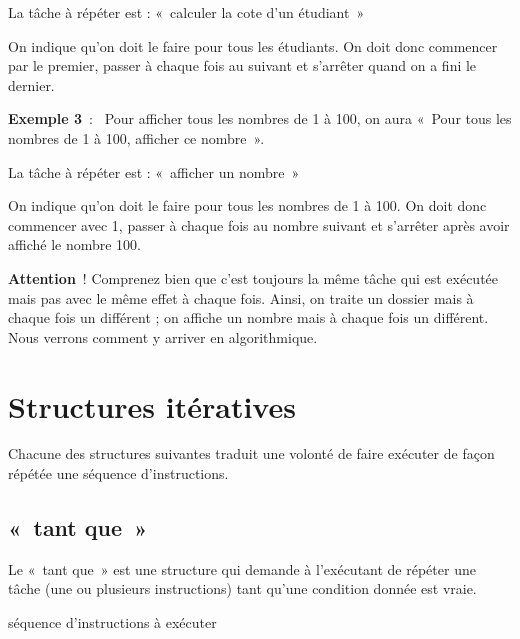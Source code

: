 	\begin{liste}
	\item 
		La tâche à répéter est : «~calculer la cote d’un étudiant~»
	\item 
		On indique qu’on doit le faire pour tous les étudiants.
		On doit donc commencer par le premier, passer à chaque fois au suivant
		et s’arrêter quand on a fini le dernier.
	\end{liste}

	\textbf{Exemple 3}~:~
	Pour afficher tous les nombres de 1 à 100, on aura
	«~Pour tous les nombres de 1 à 100, afficher ce nombre~».

	\begin{liste}
	\item
		La tâche à répéter est : «~afficher un nombre~»
	\item 
		On indique qu’on doit le faire pour tous les nombres de 1 à 100. 
		On doit donc commencer avec 1, 
		passer à chaque fois au nombre suivant 
		et s’arrêter après avoir affiché le nombre 100.
	\end{liste}

	\textbf{Attention}~! 
	Comprenez bien que c’est toujours la même tâche qui est exécutée 
	mais pas avec le même effet à chaque fois. 
	Ainsi, on traite un dossier mais à chaque fois un différent ; 
	on affiche un nombre mais à chaque fois un différent. 
	Nous verrons comment y arriver en algorithmique.

\section{Structures itératives}

	Chacune des structures suivantes traduit une volonté de faire exécuter
	de façon répétée une séquence d’instructions. 

	\subsection{«~tant que~»}

		Le «~tant que~» est une structure qui demande à
		l’exécutant de répéter une tâche (une ou plusieurs
		instructions) tant qu’une condition donnée est vraie.

		\begin{Pseudocode}
			\Stmt séquence d’instructions à exécuter
		\EndWhile
		\end{Pseudocode}

